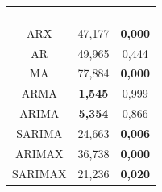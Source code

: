 \begin{table}[H]
\begin{subtable}{0.46\linewidth}
\begin{tabular}{@{}ccc@{}}
			& & \\
			& & \\
			& & \\
			& & \\ \midrule
			ARX & 47,177 & \textbf{0,000} \\
			AR & 49,965 & 0,444 \\
			MA & 77,884 & \textbf{0,000} \\
			ARMA & \textbf{1,545} & 0,999 \\
			ARIMA & \textbf{5,354} & 0,866 \\
			SARIMA & 24,663 & \textbf{0,006} \\
			ARIMAX & 36,738 & \textbf{0,000} \\
			SARIMAX & 21,236 & \textbf{0,020} \\ \bottomrule
		\end{tabular}
	\end{subtable}
	
	\vspace{1em}
	

\end{table}
